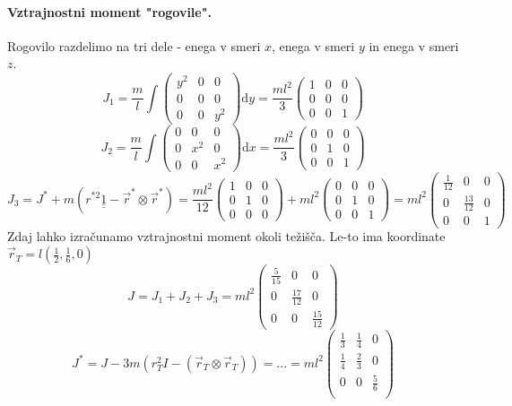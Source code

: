 \documentclass[a4paper]{article}
\newcommand{\vct}[1]{\overrightarrow{#1}}
\newcommand{\dif}{\mathrm{d}}
\newcommand{\vr}{\vct{r}}
\newcommand{\duline}[1]{\underline{\underline{#1}}}
\begin{document}
\paragraph{Vztrajnostni moment "rogovile".} Rogovilo razdelimo na tri dele - enega v smeri $x$, enega v smeri $y$ in enega v smeri $z$.
$$J_1 = \frac{m}{l} \int \begin{pmatrix}
    y^2 & 0 & 0 \\
    0 & 0 & 0 \\
    0 & 0 & y^2
\end{pmatrix}\dif y = \frac{ml^2}{3}\begin{pmatrix}
    1 & 0 & 0 \\
    0 & 0 & 0 \\
    0 & 0 & 1
\end{pmatrix}$$
$$J_2 = \frac{m}{l} \int \begin{pmatrix}
    0 & 0 & 0 \\
    0 & x^2 & 0 \\
    0 & 0 & x^2
\end{pmatrix}\dif x = \frac{ml^2}{3}\begin{pmatrix}
    0 & 0 & 0 \\
    0 & 1 & 0 \\
    0 & 0 & 1
\end{pmatrix}$$
$$J_3 = J^* + m(r^{*2}\duline{1} - \vct{r}^*\otimes\vct{r}^*) = \frac{ml^2}{12}\begin{pmatrix}
    1 & 0 & 0 \\
    0 & 1 & 0 \\
    0 & 0 & 0
\end{pmatrix} + ml^2\begin{pmatrix}
    0 & 0 & 0 \\
    0 & 1 & 0 \\
    0 & 0 & 1
\end{pmatrix} = ml^2\begin{pmatrix}
    \frac{1}{12} & 0 & 0 \\
    0 & \frac{13}{12} & 0 \\
    0 & 0 & 1
\end{pmatrix}$$
Zdaj lahko izračunamo vztrajnostni moment okoli težišča. Le-to ima koordinate $\vr_T = l(\frac{1}{2}, \frac{1}{6}, 0)$
$$J = J_1 + J_2 + J_3 = ml^2\begin{pmatrix}
    \frac{5}{15} & 0 & 0 \\
    0 & \frac{17}{12} & 0 \\
    0 & 0 & \frac{15}{12}
\end{pmatrix}$$
$$J^* = J - 3m(r_T^2I - (\vr_T\otimes\vr_T)) = ... = ml^2\begin{pmatrix}
    \frac{1}{3} & \frac{1}{4} & 0 \\
    \frac{1}{4} & \frac{2}{3} & 0 \\
    0 & 0 & \frac{5}{6} \\
\end{pmatrix}$$
\end{document}
